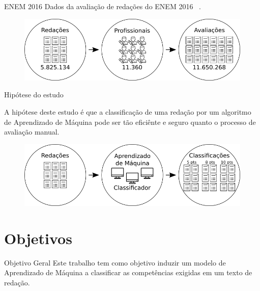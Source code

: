 \documentclass[10pt]{beamer}
\begin{document}
\begin{frame}[fragile]{ENEM 2016}
Dados da avaliação de redações do ENEM 2016 ~\cite{paq_a:2016}.

\begin{figure}[H]
\begin{center}
    \includegraphics[scale=0.52]{images/enem_2016.png}
\end{center}
\label{fig:enem_2016}
\end{figure}

\end{frame}

\begin{frame}[fragile]{Hipótese do estudo}

A hipótese deste estudo é que a classificação de uma redação por um algoritmo de Aprendizado de Máquina pode ser tão eficiênte e seguro quanto o processo de avaliação manual.

\begin{figure}[H]
\begin{center}
    \includegraphics[scale=0.52]{images/automatic_essay_system.png}
\end{center}
\label{fig:enem_2016}
\end{figure}

\end{frame}

\section{Objetivos}

\begin{frame}[fragile]{Objetivo Geral}
Este trabalho tem como objetivo induzir um modelo de Aprendizado de Máquina a classificar as competências exigidas em um texto de redação.
\end{frame}
\end{document}
